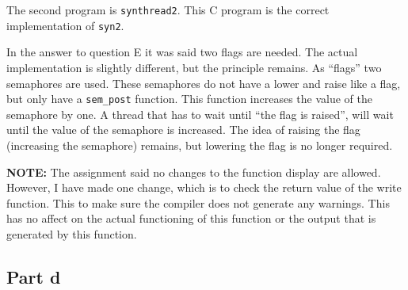 \documentclass[a4paper]{article}
\begin{document}
The second program is \texttt{synthread2}. This C program is the correct implementation of
\texttt{syn2}.

In the answer to question E it was said two flags are needed. The actual implementation is
slightly different, but the principle remains. As ``flags'' two semaphores are used. These
semaphores do not have a lower and raise like a flag, but only have a \texttt{sem\_post}
function. This function increases the value of the semaphore by one. A thread that has to
wait until ``the flag is raised'', will wait until the value of the semaphore is 
increased. The idea of raising the flag (increasing the semaphore) remains, but lowering 
the flag is no longer required.

\textbf{NOTE:} The assignment said no changes to the function display are allowed. 
However, I have made one change, which is to check the return value of the write function.
This to make sure the compiler does not generate any warnings. This has no affect on the
actual functioning of this function or the output that is generated by this function.

\subsection{Part d}
\end{document}
